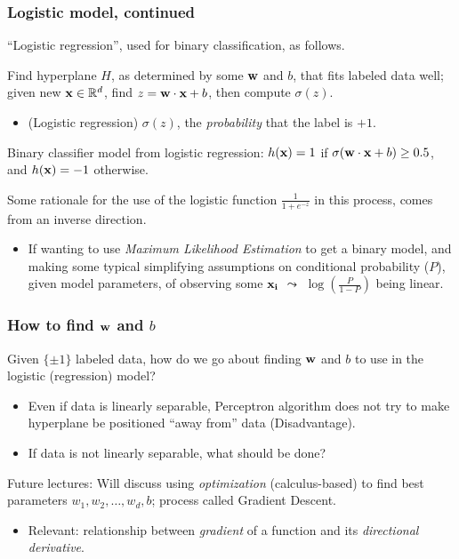 \documentclass{beamer}
\theoremstyle{example}
\begin{document}
\begin{frame}
\frametitle{Logistic model, continued}
    ``Logistic regression'', used for binary classification, as follows.
    
    Find hyperplane $H$, as determined by some ${\bf w}$ and $b$, that fits labeled data well; given new ${\bf x}\in\mathbb R^d$, find $z = {\bf w}\cdot{\bf x}+b$, then compute $\sigma(z)$. 
    \begin{itemize}
        \item (Logistic regression) $\sigma(z)$, the \textit{probability} that the label is $+1$.
    \end{itemize}
    
    Binary classifier model from logistic regression: $h({\bf x})=1$ if $\sigma({\bf w}\cdot{\bf x}+b) \ge 0.5$, and $h({\bf x})=-1$ otherwise. 
    
    \pause 
    Some rationale for the use of the logistic function $\frac{1}{1+e^{-z}}$ in this process, comes from an inverse direction. 
    \begin{itemize}
        \item If wanting to use \textit{Maximum Likelihood Estimation} to get a binary model, and making some typical simplifying assumptions on conditional probability ($P$), given model parameters, of observing some ${\bf x_i}$ $\leadsto$ $\log\left(\frac{P}{1-P}\right)$ being linear.
    \end{itemize}

\end{frame}
\begin{frame}
    \frametitle{How to find ${\bf w}$ and $b$}
    Given $\{\pm1\}$ labeled data, how do we go about finding ${\bf w}$ and $b$ to use in the logistic (regression) model?

    \begin{itemize}
        \item Even if data is linearly separable, Perceptron algorithm does not try to make hyperplane be positioned ``away from'' data (Disadvantage). 
        \item If data is not linearly separable, what should be done?
    \end{itemize}

    Future lectures: Will discuss using \emph{optimization} (calculus-based) to find best parameters $w_1,w_2,\ldots,w_d,b$; process called Gradient Descent. 
    \begin{itemize}
        \item Relevant: relationship between \emph{gradient} of a function and its \emph{directional derivative}.
    \end{itemize}
\end{frame}
\end{document}
